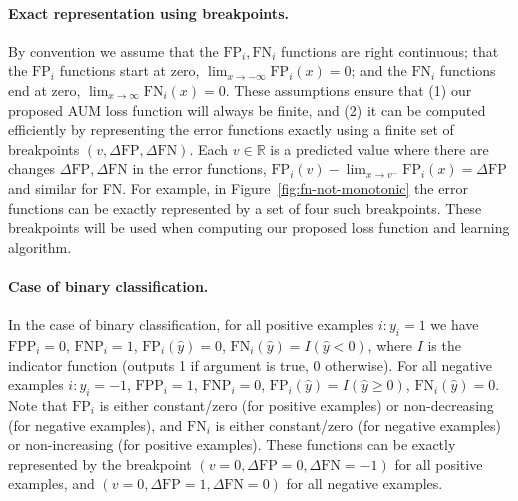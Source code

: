 \documentclass{article}
\begin{document}
\paragraph{Exact representation using breakpoints.} 
By convention we assume that the $\text{FP}_i,\text{FN}_i$ functions are right continuous; 
that the $\text{FP}_i$ functions start at zero, $\lim_{x\rightarrow -\infty}\text{FP}_i(x)=0$; 
and the $\text{FN}_i$ functions end at zero, $\lim_{x\rightarrow \infty} \text{FN}_i(x)=0$. 
These assumptions ensure that (1) our proposed AUM loss function will always be finite, and (2) it can be computed efficiently by representing the error functions exactly using a finite set of breakpoints $(v,\Delta\text{FP},\Delta\text{FN})$. 
Each $v\in\mathbb R$ is a predicted value where there are changes $\Delta\text{FP},\Delta\text{FN}$ in the error functions, $\text{FP}_i(v)-\lim_{x\rightarrow v^-} \text{FP}_i(x)= \Delta\text{FP}$ and similar for FN.
For example, in Figure~\ref{fig:fn-not-monotonic} the error functions can be exactly represented by a set of four such breakpoints.
These breakpoints will be used when computing our proposed loss function and learning algorithm. 


\paragraph{Case of binary classification.} 
In the case of binary classification, for all positive examples $i:y_i=1$ we have 
 $\text{FPP}_i=0$, 
 $\text{FNP}_i=1$,
 $\text{FP}_i(\hat y) = 0$,
 $\text{FN}_i(\hat y) = I(\hat y < 0)$,
where $I$ is the indicator function (outputs 1 if argument is true, 0 otherwise).
For all negative examples $i:y_i=-1$,
  $\text{FPP}_i=1$,
  $\text{FNP}_i=0$,
  $\text{FP}_i(\hat y) = I(\hat y \geq 0)$, 
  $\text{FN}_i(\hat y) = 0$.
Note that $\text{FP}_i$ is either constant/zero (for positive examples) or non-decreasing (for negative examples), and $\text{FN}_i$ is either constant/zero (for negative examples) or non-increasing (for positive examples).
These functions can be exactly represented by the breakpoint
$(v=0,\Delta\text{FP}=0,\Delta\text{FN}=-1)$ for all positive examples, and 
$(v=0,\Delta\text{FP}=1,\Delta\text{FN}=0)$ for all negative examples.
\end{document}
